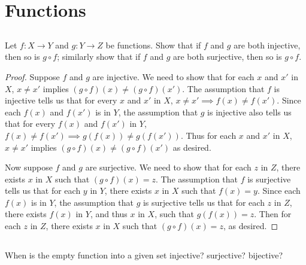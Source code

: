 \documentclass[../../main.tex]{subfiles}
\begin{document}
\ifmainfile
\else
    \maketitle
    \addtocounter{chapter}{3}
    \addtocounter{section}{2}
    \section{Functions}
\fi


\subsection{}
\begin{q}
    Let $f : X \to Y$ and $g : Y \to Z$ be functions. Show that if $f$ and $g$ are both injective, then so is $g \circ f$; similarly show that if $f$ and $g$ are both surjective, then so is $g \circ f$.
\end{q}


\begin{proof}
    Suppose $f$ and $g$ are injective.
    We need to show that for each $x$ and $x'$ in $X$, $x \neq x'$ implies $(g \circ f)(x) \neq (g \circ f)(x')$.
    The assumption that $f$ is injective tells us that for every $x$ and $x'$ in $X$, $x \neq x' \implies f(x) \neq f(x')$.
    Since each $f(x)$ and $f(x')$ is in $Y$, the assumption that $g$ is injective also tells us that for every $f(x)$ and $f(x')$ in $Y$, $f(x) \neq f(x') \implies g(f(x)) \neq g(f(x'))$.
    Thus for each $x$ and $x'$ in $X$, $x \neq x'$ implies $(g \circ f)(x) \neq (g \circ f)(x')$ as desired.
    
    Now suppose $f$ and $g$ are surjective.
    We need to show that for each $z$ in $Z$, there exists $x$ in $X$ such that $(g \circ f)(x)=z$.
    The assumption that $f$ is surjective tells us that for each $y$ in $Y$, there exists $x$ in $X$ such that $f(x)=y$.
    Since each $f(x)$ is in $Y$, the assumption that $g$ is surjective tells us that for each $z$ in $Z$, there exists $f(x)$ in $Y$, and thus $x$ in $X$, such that $g(f(x))=z$. Then for each $z$ in $Z$, there exists $x$ in $X$ such that $(g \circ f)(x)=z$, as desired. 
\end{proof}

\subsection{}
\begin{q}
    When is the empty function into a given set injective? surjective? bijective?
\end{q}
\end{document}
